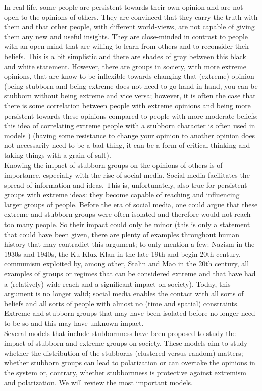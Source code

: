 \documentclass[11 pt , letterpaper , twoside , openright]{book}
\begin{document}
In real life, some people are persistent towards their own opinion and are not open to the opinions of others. They are convinced that they carry the truth with them and that other people, with different world-views, are not capable of giving them any new and useful insights. They are close-minded in contrast to people with an open-mind that are willing to learn from others and to reconsider their beliefs. This is a bit simplistic and there are shades of gray between this black and white statement. However, there are groups in society, with more extreme opinions, that are know to be inflexible towards changing that (extreme) opinion (being stubborn and being extreme does not need to go hand in hand, you can be stubborn without being extreme and vice versa; however, it is often the case that there is some correlation between people with extreme opinions and being more persistent towards these opinions compared to people with more moderate beliefs; this idea of correlating extreme people with a stubborn character is often used in models \cite{Deffuant2006}\cite{Deffuant2002}\cite{Turner}) (having some resistance to change your opinion to another opinion does not necessarily need to be a bad thing, it can be a form of critical thinking and taking things with a grain of salt).\\ 
\newline
Knowing the impact of stubborn groups on the opinions of others is of importance, especially with the rise of social media. Social media facilitates the spread of information and ideas. This is, unfortunately, also true for persistent groups with extreme ideas: they become capable of reaching and influencing larger groups of people. Before the era of social media, one could argue that these extreme and stubborn groups were often isolated and therefore would not reach too many people. So their impact could only be minor (this is only a statement that could have been given, there are plenty of examples throughout human history that may contradict this argument; to only mention a few: Nazism in the 1930s and 1940s, the Ku Klux Klan in the late 19th and begin 20th century, communism exploited by, among other, Stalin and Mao in the 20th century, all examples of groups or regimes that can be considered extreme and that have had a (relatively) wide reach and a significant impact on society). Today, this argument is no longer valid; social media enables the contact with all sorts of beliefs and all sorts of people with almost no (time and spatial) constraints. Extreme and stubborn groups that may have been isolated before no longer need to be so and this may have unknown impact. \\
\newline
Several models that include stubbornness have been proposed to study the impact of stubborn and extreme groups on society. These models aim to study whether the distribution of the stubborns (clustered versus random) matters; whether stubborn groups can lead to polarization or can overtake the opinions in the system or, contrary, whether stubbornness is protective against extremism and polarization. We will review the most important models.
\end{document}

